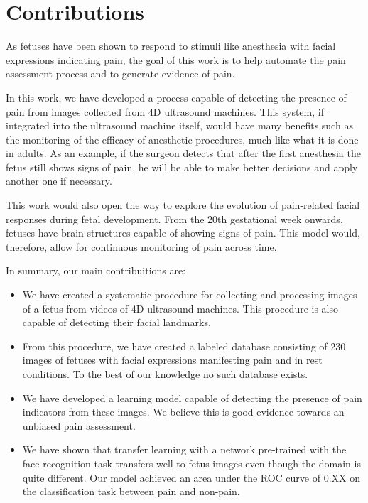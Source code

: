 \documentclass[msc]{ppgccufmg}
\begin{document}
\section{Contributions}

As fetuses have been shown to respond to stimuli like anesthesia with facial expressions indicating pain, the goal of this work is to help automate the pain assessment process and to generate evidence of pain.

In this work, we have developed a process capable of detecting the presence of pain from images collected from 4D ultrasound machines. This system, if integrated into the ultrasound machine itself, would have many benefits such as the monitoring of the efficacy of anesthetic procedures, much like what it is done in adults. As an example, if the surgeon detects that after the first anesthesia the fetus still shows signs of pain, he will be able to make better decisions and apply another one if necessary.

This work would also open the way to explore the evolution of pain-related facial responses during fetal development. From the 20th gestational week onwards, fetuses have brain structures capable of showing signs of pain. This model would, therefore, allow for continuous monitoring of pain across time.

In summary, our main contribuitions are:

\begin{itemize}
    \item We have created a systematic procedure for collecting and processing images of a fetus from videos of 4D ultrasound machines. This procedure is also capable of detecting their facial landmarks.
    \item From this procedure, we have created a labeled database consisting of 230 images of fetuses with facial expressions manifesting pain and in rest conditions. To the best of our knowledge no such database exists.
    \item We have developed a learning model capable of detecting the presence of pain indicators from these images. We believe this is good evidence towards an unbiased pain assessment.
    \item We have shown that transfer learning with a network pre-trained with the face recognition task transfers well to fetus images even though the domain is quite different. Our model achieved an area under the ROC curve of 0.XX on the classification task between pain and non-pain. 
\end{itemize}
\end{document}
